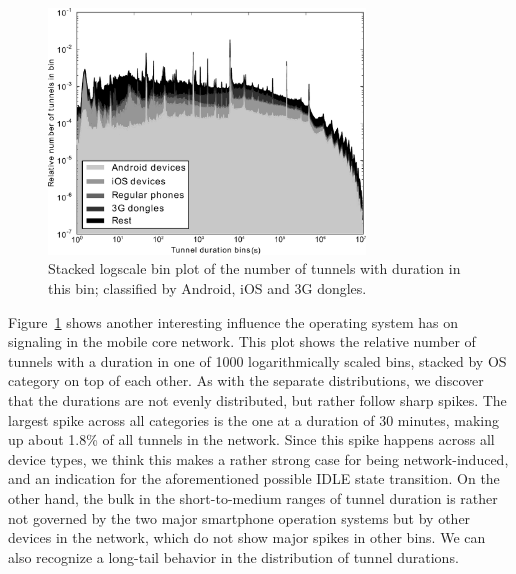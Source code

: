 \begin{figure}
\centering
\includegraphics[width=0.75\textwidth]{images/stacked-durations-2-fixed.pdf}
\caption{Stacked logscale bin plot of the number of tunnels with duration in this bin; classified by Android, iOS and 3G dongles.}
\label{fig:stacked-durations}
\end{figure}

Figure~\ref{fig:stacked-durations} shows another interesting influence the operating system has on signaling in the mobile core network. This plot shows the relative number of tunnels with a duration in one of 1000 logarithmically scaled bins, stacked by OS category on top of each other. As with the separate distributions, we discover that the durations are not evenly distributed, but rather follow sharp spikes. The largest spike across all categories is the one at a duration of 30 minutes, making up about 1.8\% of all tunnels in the network. Since this spike happens across all device types, we think this makes a rather strong case for being network-induced, and an indication for the aforementioned possible IDLE state transition. On the other hand, the bulk in the short-to-medium ranges of tunnel duration is rather not governed by the two major smartphone operation systems but by other devices in the network, which do not show major spikes in other bins. We can also recognize a long-tail behavior in the distribution of tunnel durations.



